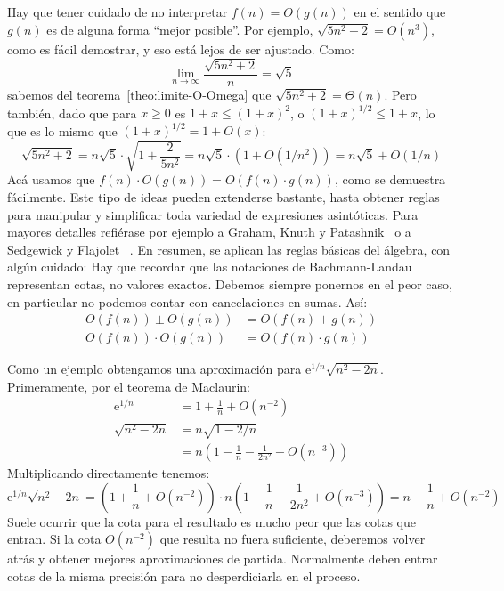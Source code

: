   Hay que tener cuidado de no interpretar \(f(n) = O(g(n))\)
  en el sentido que \(g(n)\) es de alguna forma ``mejor posible''.
  Por ejemplo,
  \(\sqrt{5 n^2 + 2} = O(n^3)\),
  como es fácil demostrar,
  y eso está lejos de ser ajustado.
  Como:
  \begin{equation*}
    \lim_{n \rightarrow \infty} \frac{\sqrt{5 n^2 + 2}}{n}
       = \sqrt{5}
  \end{equation*}
  sabemos del teorema~\ref{theo:limite-O-Omega}
  que \(\sqrt{5 n^2 + 2} = \Theta(n)\).
  Pero también,
  dado que para \(x \ge 0\) es \(1 + x \le (1 + x)^2\),
  o \((1 + x)^{1/2} \le 1 + x\),
  lo que es lo mismo que \((1 + x)^{1/2} = 1 + O(x)\):
  \begin{equation*}
    \sqrt{5 n^2 + 2}
       = n \sqrt{5} \cdot \sqrt{1 + \frac{2}{5 n^2}}
       = n \sqrt{5} \cdot \left( 1 + O(1 / n^2) \right)
       = n \sqrt{5} + O(1 / n)
  \end{equation*}
  Acá usamos que \(f(n) \cdot O(g(n)) = O(f(n) \cdot g(n))\),
  como se demuestra fácilmente.
  Este tipo de ideas pueden extenderse bastante,
  hasta obtener reglas para manipular y simplificar
  toda variedad de expresiones asintóticas.
  Para mayores detalles refiérase por ejemplo a
  Graham, Knuth y Patashnik~%
    \cite{graham94:_concr_mathem}
  o a Sedgewick y Flajolet~%
    \cite[capítulo 4]{sedgewick13:_introd_anal_algor}.
  En resumen,
  se aplican las reglas básicas del álgebra,
  con algún cuidado:
  Hay que recordar que las notaciones de Bachmann-Landau
  representan cotas,
  no valores exactos.
  Debemos siempre ponernos en el peor caso,
  en particular no podemos contar con cancelaciones en sumas.
  Así:
  \begin{align*}
    O(f(n)) \pm O(g(n))
      &= O(f(n) + g(n)) \\
    O(f(n)) \cdot O(g(n))
      &= O(f(n) \cdot g(n))
  \end{align*}

  Como un ejemplo obtengamos una aproximación
  para \(\mathrm{e}^{1 / n} \sqrt{n^2 - 2 n}\).
  Primeramente,
  por el teorema de Maclaurin:%
  \begin{align*}
    \mathrm{e}^{1 / n}
      &= 1 + \frac{1}{n} + O\left(n^{-2}\right) \\
    \sqrt{n^2 - 2 n}
      &= n \sqrt{1 - 2 / n} \\
      &= n \left(
	      1 - \frac{1}{n}
		- \frac{1}{2 n^2}
		+ O\left(n^{-3}\right)
	    \right)
  \end{align*}
  Multiplicando directamente tenemos:
  \begin{equation*}
     \mathrm{e}^{1 / n} \sqrt{n^2 - 2 n}
      = \left(
	  1 + \frac{1}{n} + O\left(n^{-2}\right)
	\right)
	  \cdot n
	     \left(
	1 - \frac{1}{n} - \frac{1}{2 n^2} + O\left(n^{-3}\right)
	     \right)
      = n - \frac{1}{n} + O(n^{-2})
  \end{equation*}
  Suele ocurrir
  que la cota para el resultado
  es mucho peor que las cotas que entran.
  Si la cota \(O(n^{-2})\) que resulta no fuera suficiente,
  deberemos volver atrás
  y obtener mejores aproximaciones de partida.
  Normalmente deben entrar cotas de la misma precisión
  para no desperdiciarla en el proceso.

